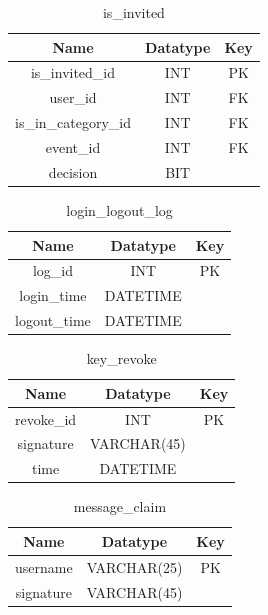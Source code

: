 \begin{table}[!ht]
\caption{is\_invited}
\centering
\begin{tabular}{c c c}
\hline\hline
Name                    & Datatype    & Key \\
\hline
is\_invited\_id         & INT         & PK  \\
user\_id                & INT         & FK  \\
is\_in\_category\_id    & INT         & FK  \\
event\_id               & INT         & FK  \\
decision                & BIT         &     \\
\hline
\end{tabular}
\label{table:nonlin}
\end{table}

\begin{table}[!ht]
\caption{login\_logout\_log}
\centering
\begin{tabular}{c c c}
\hline\hline
Name               & Datatype    & Key \\
\hline
log\_id            & INT         & PK  \\
login\_time        & DATETIME    &     \\
logout\_time       & DATETIME    &     \\
\hline
\end{tabular}
\label{table:nonlin}
\end{table}

\begin{table}[!ht]
\caption{key\_revoke}
\centering
\begin{tabular}{c c c}
\hline\hline
Name               & Datatype    & Key \\
\hline
revoke\_id         & INT          & PK  \\
signature          & VARCHAR(45)  &     \\
time               & DATETIME     &     \\
\hline
\end{tabular}
\label{table:nonlin}
\end{table}

\begin{table}[!ht]
\caption{message\_claim}
\centering
\begin{tabular}{c c c}
\hline\hline
Name               & Datatype    & Key \\
\hline
username           & VARCHAR(25) & PK  \\
signature          & VARCHAR(45) &     \\
\hline
\end{tabular}
\label{table:nonlin}
\end{table}


